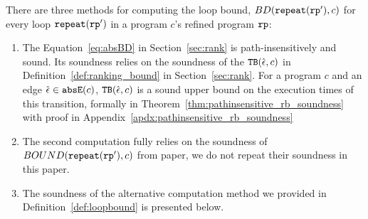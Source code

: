 
There are three methods for computing the loop bound, $BD(\mathtt{repeat}(\mathtt{rp}'), c)$ for every loop $\mathtt{repeat}(\mathtt{rp}')$ in a program $c$'s refined program $\mathtt{rp}$:
\begin{enumerate}
    \item The Equation~\ref{eq:absBD} in Section~\ref{sec:rank} is path-insensitively and sound.
    Its soundness relies on the soundness of the ${\mathtt{TB}}(\hat{\mathtt{\epsilon}{}}, c)$ in Definition~\ref{def:ranking_bound} in Section~\ref{sec:rank}.
    For a program $c$ and an edge $\hat{\mathtt{\epsilon}{}} \in \mathtt{abs}{\mathtt{E}}(c)$, ${\mathtt{TB}}(\hat{\mathtt{\epsilon}{}}, c)$ is a sound upper bound on the execution times of this transition, formally in Theorem~\ref{thm:pathinsensitive_rb_soundness} with proof in Appendix~\ref{apdx:pathinsensitive_rb_soundness}    
    \item The second computation fully relies on the soundness of $BOUND(\mathtt{repeat}(\mathtt{rp}'), c)$ from paper\cite{GulwaniJK09}, we do not repeat their soundness in this paper.
    \item   The soundness of the alternative computation method we provided in Definition~\ref{def:loopbound} is presented below.
  \end{enumerate}

